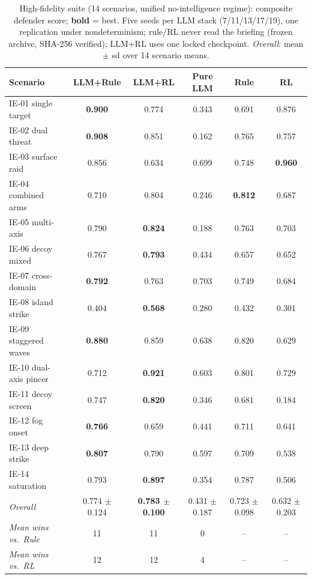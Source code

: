 \begin{table}[t]
\centering
\caption{High-fidelity suite (14 scenarios, unified no-intelligence regime): composite defender score; \textbf{bold} = best. Five seeds per LLM stack (7/11/13/17/19), one replication under nondeterminism; rule/RL never read the briefing (frozen archive, SHA-256 verified); LLM+RL uses one locked checkpoint. \emph{Overall}: mean $\pm$ sd over 14 scenario means.}
\label{tab:hifi}
\footnotesize
\setlength{\tabcolsep}{3pt}
\begin{tabular}{@{}lccccc@{}}
\toprule
Scenario & LLM+Rule & LLM+RL & Pure LLM & Rule & RL \\
\midrule
IE-01 single target & \textbf{0.900} & 0.774 & 0.343 & 0.691 & 0.876 \\
IE-02 dual threat & \textbf{0.908} & 0.851 & 0.162 & 0.765 & 0.757 \\
IE-03 surface raid & 0.856 & 0.634 & 0.699 & 0.748 & \textbf{0.960} \\
IE-04 combined arms & 0.710 & 0.804 & 0.246 & \textbf{0.812} & 0.687 \\
IE-05 multi-axis & 0.790 & \textbf{0.824} & 0.188 & 0.763 & 0.703 \\
IE-06 decoy mixed & 0.767 & \textbf{0.793} & 0.434 & 0.657 & 0.652 \\
IE-07 cross-domain & \textbf{0.792} & 0.763 & 0.703 & 0.749 & 0.684 \\
IE-08 island strike & 0.404 & \textbf{0.568} & 0.280 & 0.432 & 0.301 \\
IE-09 staggered waves & \textbf{0.880} & 0.859 & 0.638 & 0.820 & 0.629 \\
IE-10 dual-axis pincer & 0.712 & \textbf{0.921} & 0.603 & 0.801 & 0.729 \\
IE-11 decoy screen & 0.747 & \textbf{0.820} & 0.346 & 0.681 & 0.184 \\
IE-12 fog onset & \textbf{0.766} & 0.659 & 0.441 & 0.711 & 0.641 \\
IE-13 deep strike & \textbf{0.807} & 0.790 & 0.597 & 0.709 & 0.538 \\
IE-14 saturation & 0.793 & \textbf{0.897} & 0.354 & 0.787 & 0.506 \\
\midrule
\emph{Overall} & 0.774 $\pm$ 0.124 & \textbf{0.783 $\pm$ 0.100} & 0.431 $\pm$ 0.187 & 0.723 $\pm$ 0.098 & 0.632 $\pm$ 0.203 \\
\emph{Mean wins vs.\ Rule} & 11 & 11 & 0 & -- & -- \\
\emph{Mean wins vs.\ RL} & 12 & 12 & 4 & -- & -- \\
\bottomrule
\end{tabular}
\end{table}
